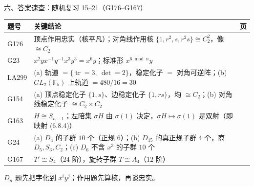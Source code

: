 \documentclass[aspectratio=169,10pt,fontset=none]{ctexbeamer}
\begin{document}
\begin{frame}[t]{六、答案速查：随机复习 15--21（G176--G167）}
  \centering
  \scriptsize
  \setlength{\tabcolsep}{3pt}
  \renewcommand{\arraystretch}{1.22}
  \begin{tabular}{@{}l p{10.0cm} c@{}}
    \toprule
    题号 & 关键结论 & 页\\
    \midrule
    G176 & 顶点作用忠实（核平凡）；对角线作用核 $\{1,r^2,s,r^2s\}\cong C_2^2$，像 $\cong C_2$ & \pageref{ex:G176}\\
    G23 & $x^2yx^{-1}y^{-1}x^3y^3=x^6y$；标准形 $x^{6\bmod n}y$ & \pageref{ex:G23}\\
    LA299 & (a) 轨道 $=\{\operatorname{tr}=3,\ \det=2\}$，稳定化子 $=$ 对角可逆阵；(b) $GL_2(\mathbb F_5)$ 上轨道 $=480/16=30$ & \pageref{ex:LA299}\\
    G154 & (a) 顶点稳定化子 $\{1,s\}$、边稳定化子 $\{1,rs\}$，均 $\cong C_2$；(b) 对角线稳定化子 $\cong C_2\times C_2$ & \pageref{ex:G154}\\
    G163 & $H\cong S_{n-1}$；左陪集 $\sigma H$ 由 $\sigma(1)$ 决定，$\sigma H\mapsto\sigma(1)$ 是双射（即映射 (6.8.4)） & \pageref{ex:G163}\\
    G24 & (a) $D_4$ 的子群 $10$ 个（正规 $6$）；(b) $D_{15}$ 的真正规子群 $4$ 个，商 $D_5,S_3,C_2$；(c) $D_6$ 不含 $x^3$ 的子群 $10$ 个 & \pageref{ex:G24}\\
    G167 & $T'\cong S_4$（$24$ 阶），旋转子群 $T\cong A_4$（$12$ 阶） & \pageref{ex:G167}\\
    \bottomrule
  \end{tabular}
  \par
  \vspace{0.3em}
  {\scriptsize\color{ink!70} $D_n$ 题先把字化到 $x^iy^j$；作用题先算核，再谈忠实。}
\end{frame}
\end{document}
